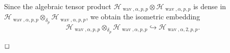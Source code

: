 \documentclass[12pt]{article}
\DeclareMathOperator{\wav}{wav}
\newenvironment{proof}{\begin{trivlist}
    \item[\hskip\labelsep{\it Proof.}]}{$\hfill\Box$\end{trivlist}}
\newcommand{\bsk}{\boldsymbol{k}}
\newcommand{\bsi}{\boldsymbol{i}}
\newcommand{\bsj}{\boldsymbol{j}}
\newcommand{\HH}{\mathcal{H}}
\begin{document}
\begin{proof}[Proof of Theorem~\ref{tensor17}]

Since the algebraic tensor product $\HH_{\wav,\alpha,p,p} \otimes \HH_{\wav,\alpha,p,p}$
is dense in $\HH_{\wav,\alpha,p,p} \otimes_{\delta_p} \HH_{\wav,\alpha,p,p}$, we obtain the isometric embedding
\begin{equation}\label{isom_embed}
 \HH_{\wav,\alpha,p,p} \otimes_{\delta_p} \HH_{\wav,\alpha,p,p} \hookrightarrow 
\HH_{\wav,\alpha,2,p,p}.
\end{equation}


\end{proof}
\end{document}
